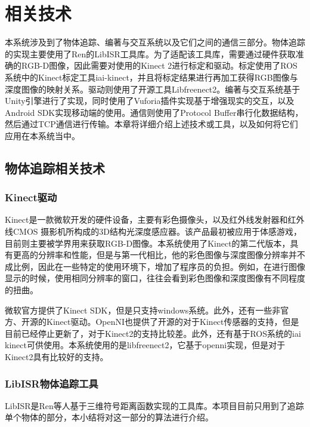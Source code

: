 \chapter{相关技术}
\label{chap:tech}

本系统涉及到了物体追踪、编著与交互系统以及它们之间的通信三部分。物体追踪的实现主要使用了Ren的LibISR工具库\cite{Ren_3DV_2014,star3d_iccv_2013}。为了适配该工具库，需要通过硬件获取准确的RGB-D图像，因此需要对使用的Kinect 2进行标定和驱动。标定使用了ROS系统中的Kinect标定工具iai-kinect\cite{iai_kinect2}，并且将标定结果进行再加工获得RGB图像与深度图像的映射关系。驱动则使用了开源工具Libfreenect2\cite{libfreenect2}。编著与交互系统基于Unity引擎\cite{Unity}进行了实现，同时使用了Vuforia插件\cite{Vuforia}实现基于增强现实的交互，以及Android SDK\cite{Android}实现移动端的使用。通信则使用了Protocol Buffer\cite{Protobuf, ProtobufNet}串行化数据结构，然后通过TCP通信进行传输。本章将详细介绍上述技术或工具，以及如何将它们应用在本系统当中。

\section{物体追踪相关技术}
\subsection{Kinect驱动}
Kinect是一款微软开发的硬件设备，主要有彩色摄像头，以及红外线发射器和红外线CMOS 摄影机所构成的3D结构光深度感应器。该产品最初被应用于体感游戏，目前则主要被学界用来获取RGB-D图像。本系统使用了Kinect的第二代版本，具有更高的分辨率和性能，但是与第一代相比，他的彩色图像与深度图像分辨率并不成比例，因此在一些特定的使用环境下，增加了程序员的负担。例如，在进行图像显示的时候，使用相同分辨率的窗口，往往会看到彩色图像和深度图像有不同程度的扭曲。

微软官方提供了Kinect SDK，但是只支持windows系统。此外，还有一些非官方、开源的Kinect驱动。OpenNI\cite{Openni}也提供了开源的对于Kinect传感器的支持，但是目前已经停止更新了，对于Kinect2的支持比较差。此外，还有基于ROS系统的iai kinect\cite{iai_kinect2}可供使用。本系统使用的是libfreenect2\cite{libfreenect2}，它基于openni实现，但是对于Kinect2具有比较好的支持。

\subsection{LibISR物体追踪工具}
LibISR是Ren等人基于三维符号距离函数实现的工具库\cite{Ren_3DV_2014, star3d_iccv_2013}。本项目目前只用到了追踪单个物体的部分，本小结将对这一部分的算法进行介绍\cite{ren2017real}。

